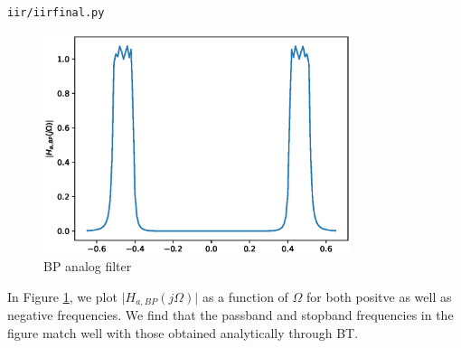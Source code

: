 \documentclass[journal,12pt,twocolumn]{IEEEtran}
\begin{document}
\begin{enumerate}
{\begin{equation}
\end{equation}
}
\begin{lstlisting}
iir/iirfinal.py
\end{lstlisting}
\begin{figure}
    \centering
    \includegraphics[width=9cm]{./figure/iir/iir_BPanalog.eps}
    \caption{BP analog filter}
    \label{fig:Analog_BP}
\end{figure}
In Figure \ref{fig:Analog_BP}, we plot $\vert H_{a,BP}(j\Omega)\vert$ as a function of $\Omega$ for both positve as
well as negative frequencies.  We find that the passband and stopband frequencies in the figure
match well with those obtained analytically through BT.
\end{enumerate}
\end{document}
